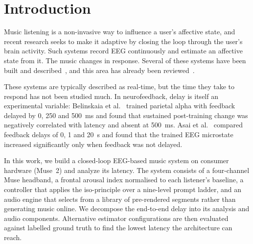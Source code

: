 \documentclass[11pt,a4paper]{article}
\begin{document}
\section{Introduction}
\label{sec:intro}

Music listening is a non-invasive way to influence a user's affective state, and recent
research seeks to make it adaptive by closing the loop through the user's brain activity.
Such systems record EEG continuously and estimate an affective state from it. The music
changes in response. Several of these systems have
been built and described~\cite{mindmelody,mindtomusic,ehrlich,neurophone,minimalist}, and
this area has already been reviewed~\cite{dashagres}.

These systems are typically described as real-time, but the time they take to respond has
not been studied much. In neurofeedback, delay is itself an experimental variable:
Belinskaia et
al.~\cite{belinskaia} trained parietal alpha with feedback delayed by 0, 250 and 500~ms and
found that sustained post-training change was negatively correlated with latency and absent
at 500~ms. Asai et al.~\cite{asai} compared feedback delays of 0, 1 and 20~s and found that
the trained EEG microstate increased significantly only when feedback was not delayed.

In this work, we build a closed-loop EEG-based music system on consumer hardware (Muse~2)
and analyze its latency. The system consists of a four-channel Muse headband, a frontal
arousal index normalised to each listener's baseline, a controller that applies the
iso-principle over a nine-level prompt ladder, and an audio engine that selects from a
library of pre-rendered segments rather than generating music online. We decompose the
end-to-end delay into its analysis and audio components. Alternative estimator
configurations are then evaluated against labelled ground truth to find the lowest latency
the architecture can reach.
\end{document}
